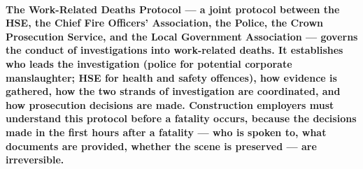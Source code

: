 {\paragraph{The Work-Related Deaths Protocol --- a joint protocol between the HSE, the Chief Fire Officers' Association, the Police, the Crown Prosecution Service, and the Local Government Association --- governs the conduct of investigations into work-related deaths. It establishes who leads the investigation (police for potential corporate manslaughter; HSE for health and safety offences), how evidence is gathered, how the two strands of investigation are coordinated, and how prosecution decisions are made. Construction employers must understand this protocol before a fatality occurs, because the decisions made in the first hours after a fatality --- who is spoken to, what documents are provided, whether the scene is preserved --- are irreversible.}

}
